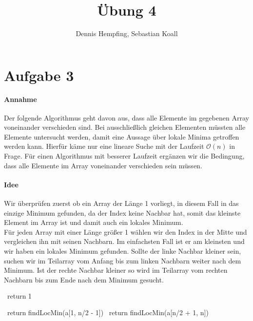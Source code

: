 \documentclass[12pt]{scrartcl}%
\theoremstyle{nonumberplain}
\newcommand{\bO}[1]{\mathcal O(#1)}
\begin{document}
\author{Dennis Hempfing, Sebastian Koall}
\title{Übung 4}
\date{} 
\pagestyle{myheadings}

\maketitle %

\section*{Aufgabe 3}

\paragraph{Annahme} Der folgende Algorithmus geht davon aus, dass alle Elemente im gegebenen Array voneinander verschieden sind. Bei ausschließlich gleichen Elementen müssten alle Elemente untersucht werden, damit eine Aussage über lokale Minima getroffen werden kann. Hierfür käme nur eine lineare Suche mit der Laufzeit $\bO{n}$ in Frage. Für einen Algorithmus mit besserer Laufzeit ergänzen wir die Bedingung, dass alle Elemente im Array voneinander verschieden sein müssen.

\paragraph{Idee} Wir überprüfen zuerst ob ein Array der Länge 1 vorliegt, in diesem Fall in das einzige Minimum gefunden, da der Index keine Nachbar hat, somit das kleinste Element im Array ist und damit auch ein lokales Minimum. \\
Für jeden Array mit einer Länge größer 1 wählen wir den Index in der Mitte und vergleichen ihn mit seinen Nachbarn. Im einfachsten Fall ist er am kleinsten und wir haben ein lokales Minimum gefunden. Sollte der linke Nachbar kleiner sein, suchen wir im Teilarray vom Anfang bis zum linken Nachbarn weiter nach dem Minimum. Ist der rechte Nachbar kleiner so wird im Teilarray vom rechten Nachbarn bis zum Ende nach dem Minimum gesucht.

\begin{algorithm}[ht!]
	
	\BlankLine
	 {\
		return 1\;
	}
	
	 {\
		return findLocMin(a[1, n/2 - 1])\;
	}  {\
		return findLocMin(a[n/2 + 1, n])\;
	} \Else {\
		return n/2\;
	}	
\end{algorithm}
\end{document}

